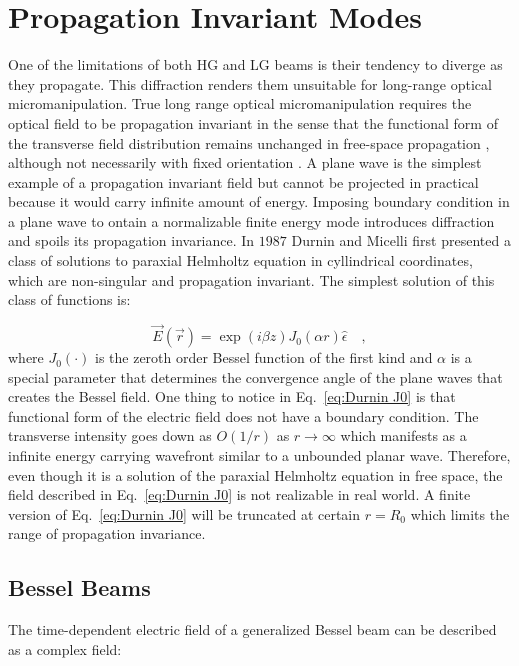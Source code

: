 \section{Propagation Invariant Modes}

One of the limitations of both HG and LG beams is their tendency to diverge as they propagate. This diffraction renders them unsuitable for long-range optical micromanipulation. True long range optical micromanipulation requires the optical field to be propagation invariant \cite{TURUNEN20101} in the sense that the functional form of the transverse field distribution remains unchanged in free-space propagation \cite{bouchal1996}, although not necessarily with fixed orientation \cite{Piestun:98}. A plane wave is the simplest example of a propagation invariant field but cannot be projected in practical because it would carry infinite amount of energy. Imposing boundary condition in a plane wave to ontain a normalizable finite energy mode introduces diffraction and spoils its propagation invariance. In $1987$ Durnin and Micelli \cite{Durnin:87} first presented a class of solutions to paraxial Helmholtz  equation in cyllindrical coordinates, which are non-singular and propagation invariant. The simplest solution of this class of functions is:

\begin{equation}
\label{eq:Durnin J0}
\vec{E}(\vec{r}) = \exp (i\beta z)J_{0}(\alpha r) \hat{\epsilon} \quad ,
\end{equation}
where $J_0 (\cdot)$ is the zeroth order Bessel function of the first kind and $\alpha$ is a special parameter that determines the convergence angle of the plane waves that creates the Bessel field. One thing to notice in Eq.~\eqref{eq:Durnin J0} is that functional form of the electric field does not have a boundary condition. The transverse intensity goes down as $O(1/r)$ as $r\rightarrow \infty$ which manifests as a infinite energy carrying wavefront similar to a unbounded planar wave. Therefore, even though it is a solution of the paraxial Helmholtz equation in free space, the field described in Eq.~\eqref{eq:Durnin J0} is not realizable in real world. A finite version of Eq.~\eqref{eq:Durnin J0} will be truncated at certain $r = R_0$ which limits the range of propagation invariance.

\subsection{Bessel Beams}
\label{subsec:Bessel Beam}
The time-dependent electric field of a generalized Bessel beam \cite{bouchal1996, mcgloin2005} can be described as a complex field:

